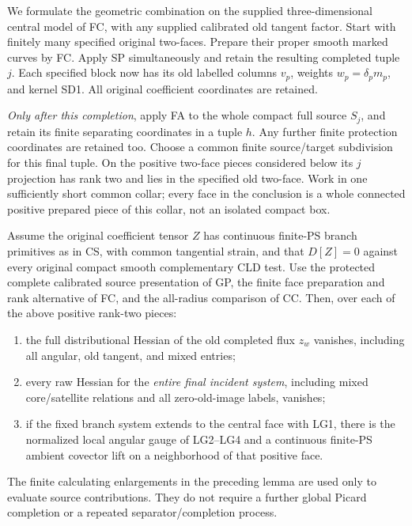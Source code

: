 We formulate the geometric combination on the supplied
three-dimensional central model of FC, with any supplied
calibrated old tangent factor.  Start with finitely many
specified original two-faces.  Prepare their proper smooth
marked curves by FC.  Apply SP simultaneously and retain the
resulting completed tuple $j$.  Each specified block now has
its old labelled columns $v_p$, weights $w_p=\delta_pm_p$, and
kernel SD1.  All original coefficient coordinates are retained.

\emph{Only after this completion}, apply FA to the whole compact
full source $S_j$, and retain its finite separating coordinates
in a tuple $h$.  Any further finite protection coordinates are
retained too.  Choose a common finite source/target subdivision
for this final tuple.  On the positive two-face pieces considered
below its $j$ projection has rank two and lies in the specified
old two-face.  Work in one sufficiently short common collar;
every face in the conclusion is a whole connected positive
prepared piece of this collar, not an isolated compact box.

\begin{theorem}
\label{thm:r13-sd-actual-final-separator-detector}
Assume the original coefficient tensor $Z$ has continuous
finite-PS branch primitives as in CS, with common tangential
strain, and that $D[Z]=0$ against every original compact smooth
complementary CLD test.  Use the protected complete calibrated
source presentation of GP, the finite face preparation and
rank alternative of FC, and the all-radius comparison of CC.
Then, over each of the above positive rank-two pieces:
\begin{enumerate}
\item the full distributional Hessian of the old completed
      flux $z_w$ vanishes, including all angular, old tangent,
      and mixed entries;
\item every raw Hessian for the \emph{entire final incident
      system}, including mixed core/satellite relations and
      all zero-old-image labels, vanishes;
\item if the fixed branch system extends to the central face
      with LG1, there is the normalized local angular gauge
      of LG2--LG4 and a continuous finite-PS ambient covector
      lift on a neighborhood of that positive face.
\end{enumerate}
The finite calculating enlargements in the preceding lemma are
used only to evaluate source contributions.  They do not
require a further global Picard completion or a repeated
separator/completion process.
\end{theorem}

